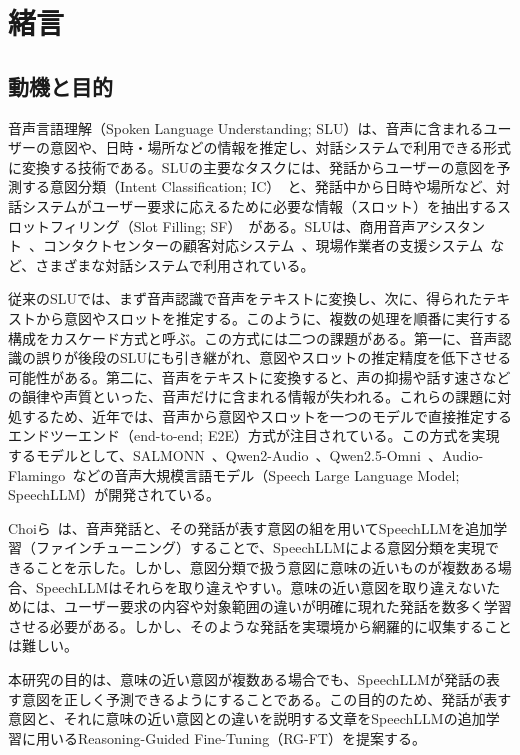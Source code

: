 \documentclass[11pt,a4paper]{ltjsarticle}
\begin{document}
\tableofcontents
\clearpage

\section{緒言}
\subsection{動機と目的}
音声言語理解（Spoken Language Understanding; SLU）は、音声に含まれるユーザーの意図や、日時・場所などの情報を推定し、対話システムで利用できる形式に変換する技術である。SLUの主要なタスクには、発話からユーザーの意図を予測する意図分類（Intent Classification; IC）~\cite{Atuhurra2024DomainAI}と、発話中から日時や場所など、対話システムがユーザー要求に応えるために必要な情報（スロット）を抽出するスロットフィリング（Slot Filling; SF）~\cite{weld2022survey}がある。SLUは、商用音声アシスタント~\cite{SaxonChoudharyMcKennaMouchtaris2021E2ESLUVoiceAssistants}、コンタクトセンターの顧客対応システム~\cite{WuMaoFeng2022AIOnlineCustomerService}、現場作業者の支援システム~\cite{LinaresGarcia2022VIVA}など、さまざまな対話システムで利用されている。

従来のSLUでは、まず音声認識で音声をテキストに変換し、次に、得られたテキストから意図やスロットを推定する。このように、複数の処理を順番に実行する構成をカスケード方式と呼ぶ。この方式には二つの課題がある。第一に、音声認識の誤りが後段のSLUにも引き継がれ、意図やスロットの推定精度を低下させる可能性がある。第二に、音声をテキストに変換すると、声の抑揚や話す速さなどの韻律や声質といった、音声だけに含まれる情報が失われる。これらの課題に対処するため、近年では、音声から意図やスロットを一つのモデルで直接推定するエンドツーエンド（end-to-end; E2E）方式が注目されている。この方式を実現するモデルとして、SALMONN~\cite{tang2024salmonn}、Qwen2-Audio~\cite{chu2024qwen2}、Qwen2.5-Omni~\cite{xu2025qwen25omni}、Audio-Flamingo~\cite{goel2025audioflamingo3}などの音声大規模言語モデル（Speech Large Language Model; SpeechLLM）が開発されている。

Choiら~\cite{choi2025exploring}は、音声発話と、その発話が表す意図の組を用いてSpeechLLMを追加学習（ファインチューニング）することで、SpeechLLMによる意図分類を実現できることを示した。しかし、意図分類で扱う意図に意味の近いものが複数ある場合、SpeechLLMはそれらを取り違えやすい。意味の近い意図を取り違えないためには、ユーザー要求の内容や対象範囲の違いが明確に現れた発話を数多く学習させる必要がある。しかし、そのような発話を実環境から網羅的に収集することは難しい。

本研究の目的は、意味の近い意図が複数ある場合でも、SpeechLLMが発話の表す意図を正しく予測できるようにすることである。この目的のため、発話が表す意図と、それに意味の近い意図との違いを説明する文章をSpeechLLMの追加学習に用いるReasoning-Guided Fine-Tuning（RG-FT）を提案する。
\end{document}

